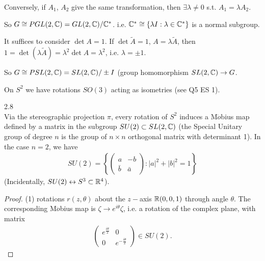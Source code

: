 \documentclass[a4paper]{article}
\begin{document}
Conversely, if $A_1$, $A_2$ give the same transformation, then $\exists \lambda \neq 0$ s.t. $A_1 = \lambda A_2$.

So $G \cong PGL(2,\mathbb{C}) = GL(2,\mathbb{C})/\mathbb{C}^*$. i.e. $\mathbb{C}^* \cong \{\lambda I: \lambda \in \mathbb{C}^*\}$ is a normal subgroup.

It suffices to consider $\det A = 1$. If $\det \tilde{A} = 1$, $A = \lambda \tilde{A}$, then $1 = \det(\lambda \tilde{A}) = \lambda^2 \det A = \lambda^2$, i.e. $\lambda = \pm 1$.

So $G \cong PSL(2,\mathbb{C}) = SL(2,\mathbb{C})/\pm I$ (group homomorphism $SL(2,\mathbb{C}) \to G$.

On $S^2$ we have rotations $SO(3)$ acting as isometries (see Q5 ES 1).

\begin{thm} 2.8\\
Via the stereographic projection $\pi$, every rotation of $S^2$ induces a M$\ddot{o}$bius map defined by a matrix in the subgroup $SU(2) \subset SL(2,\mathbb{C})$ (the Special Unitary group of degree $n$ is the group of $n\times n$ orthogonal matrix with determinant 1). In the case $n=2$, we have
\begin{equation*}
\begin{aligned}
SU(2) = \left\{\left(\begin{matrix}
a & -b\\
\bar{b} & \bar{a}
\end{matrix}\right) : |a|^2+|b|^2 = 1\right\}
\end{aligned}
\end{equation*}
(Incidentally, $SU(2) \leftrightarrow S^3 \subset \mathbb{R}^4$).
\begin{proof}
(1) rotations $r(z,\theta)$ about the $z-$axis $\mathbb{R}(0,0,1)$ through angle $\theta$. The corresponding M$\ddot{o}$bius map is $\zeta \to e^{i\theta} \zeta$, i.e. a rotation of the complex plane, with matrix
\begin{equation*}
\begin{aligned}
\left(\begin{matrix}e^\frac{i\theta}{2} & 0\\
0 & e^{-\frac{i\theta}{2}} 
\end{matrix}\right)\in SU(2).
\end{aligned}
\end{equation*}


\end{proof}
\end{thm}
\end{document}
